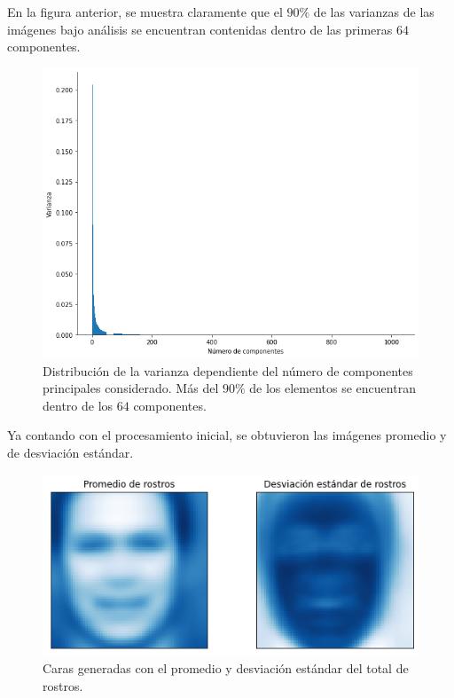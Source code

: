 \documentclass[conference]{IEEEtran}
\begin{document}
En la figura anterior, se muestra claramente que el $90\%$ de las varianzas de las imágenes bajo análisis se encuentran contenidas dentro de las primeras $64$ componentes.

\begin{figure}[H]
    \centering
    \includegraphics[scale=0.25]{imgs/dist_var.png}
    \caption{Distribución de la varianza dependiente del número de componentes principales considerado. Más del $90\%$ de los elementos se encuentran dentro de los $64$ componentes.}
    \label{fig:svd_pc}
\end{figure}

Ya contando con el procesamiento inicial, se obtuvieron las imágenes promedio y de desviación estándar.

\begin{figure}[H]
    \centering
    \includegraphics[scale=0.25]{imgs/mean_sd_faces.png}
    \caption{Caras generadas con el promedio y desviación estándar del total de rostros.}
    \label{fig:svd_pc}
\end{figure}
\end{document}
